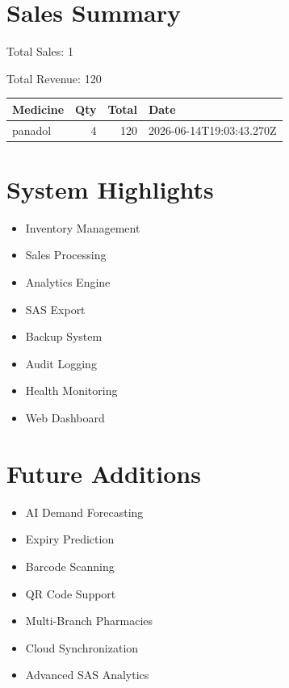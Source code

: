 \documentclass[12pt]{article}
\begin{document}
\section*{Sales Summary}

Total Sales: 1

Total Revenue: 120

\begin{longtable}{lrrl}
\toprule
Medicine & Qty & Total & Date \\
\midrule
panadol & 4 & 120 & 2026-06-14T19:03:43.270Z \\

\bottomrule
\end{longtable}

\section*{System Highlights}

\begin{itemize}
\item Inventory Management
\item Sales Processing
\item Analytics Engine
\item SAS Export
\item Backup System
\item Audit Logging
\item Health Monitoring
\item Web Dashboard
\end{itemize}

\section*{Future Additions}

\begin{itemize}
\item AI Demand Forecasting
\item Expiry Prediction
\item Barcode Scanning
\item QR Code Support
\item Multi-Branch Pharmacies
\item Cloud Synchronization
\item Advanced SAS Analytics
\end{itemize}
\end{document}
